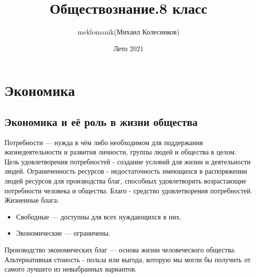 \documentclass[a4paper, 12pt]{article}
\title{Обществознание.8 класс}
\author{meklomanik(Михаил Колесников)}
\date{Лето 2021}
\begin{document}
    \maketitle{}
    
\clearpage
\tableofcontents
\section{Экономика}
\subsection{Экономика и её роль в жизни общества}
Потребности --- нужда в чём либо необходимом для поддержания жизнедеятельности и развития личности, группы людей и общества в целом.
Цель удовлетворения потребностей - создание условий для жизни и деятельности людей.
Ограниченность ресурсов - недостаточность имеющихся в распоряжении людей ресурсов для производства благ, способных удовлетворить возрастающие потребности человека и общества.
Благо - средство удовлетворения потребностей.
Жизненные блага:
\begin{itemize}
    \item Свободные --- доступны для всех нуждающихся в них.
    \item Экономические --- ограничены.
\end{itemize}
Производство экономических благ --- основа жизни человеческого общества.
Альтернативная стоиость - польза или выгода, которую мы могли бы получить от самого лучшего из невыбранных вариантов.
\end{document}
